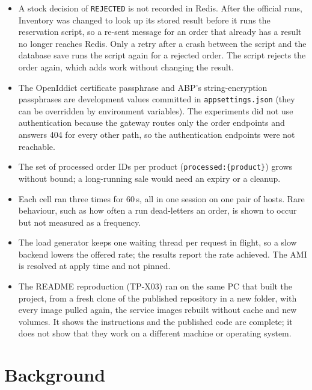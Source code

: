 \documentclass[a4paper]{report}
\begin{document}
\begin{itemize}
    limits bound only the backlog.
  \item A stock decision of \texttt{REJECTED} is not recorded in Redis. After
    the official runs, Inventory was changed to look up its
    stored result before it runs the reservation script, so a re-sent message
    for an order that already has a result no longer reaches Redis. Only a
    retry after a crash between the script and the database save runs the
    script again for a rejected order. The script rejects the order again,
    which adds work without changing the result.
  \item The OpenIddict certificate passphrase and ABP's string-encryption
    passphrases are development values committed in \texttt{appsettings.json}
    (they can be overridden by environment variables). The experiments did not
    use authentication because the gateway routes only the order endpoints and
    answers 404 for every other path, so the authentication endpoints were not
    reachable.
  \item The set of processed order IDs per product
    (\texttt{processed:\{product\}}) grows without bound; a long-running sale
    would need an expiry or a cleanup.
  \item Each cell ran three times for 60\,s, all in one session on one pair of
    hosts. Rare behaviour, such as how often a run dead-letters an order, is
    shown to occur but not measured as a frequency.
  \item The load generator keeps one waiting thread per request in flight, so a
    slow backend lowers the offered rate; the results report the rate
    achieved. The AMI is resolved at apply time and not pinned.
  \item The README reproduction (TP-X03) ran on the same PC that built the
    project, from a fresh clone of the published repository in a new folder, with
    every image pulled again, the service images rebuilt without cache and new
    volumes. It shows the instructions and the published code are complete; it
    does not show that they work on a different machine or operating system.
\end{itemize}

\chapter{Background}
\label{sec:background}
\end{document}
